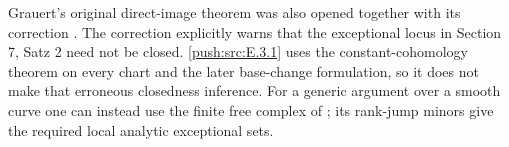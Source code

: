 Grauert's original direct-image theorem
\cite[Section 6, Hauptsatz I, and Section 7, Satz 5]{Grauert1960D}
was also opened together with its correction \cite{Grauert1963ErratumD}.
The correction explicitly warns that the exceptional locus in
Section 7, Satz 2 need not be closed.  \ref{push:src:E.3.1} uses the
constant-cohomology theorem on every chart and the later
base-change formulation, so it does not make that erroneous
closedness inference.  For a generic argument over a smooth
curve one can instead use the finite free complex of
\cite[Chapter III, Theorem 4.1]{BS76}; its rank-jump minors
give the required local analytic exceptional sets.







